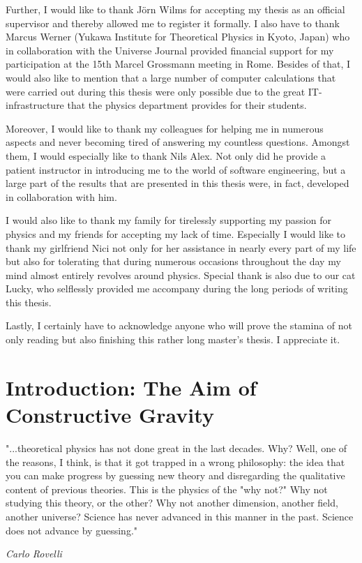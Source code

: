 \documentclass[a4paper,12pt, DIV=14, BCOR=5mm, twoside, headsepline, numbers=noenddot]{scrbook}
\begin{document}
Further, I would like to thank Jörn Wilms for accepting my thesis as an official supervisor
and thereby allowed me to register it formally. 
I also have to thank Marcus Werner (Yukawa Institute for Theoretical Physics in Kyoto, Japan) who in collaboration with the Universe Journal provided financial support for my participation at the 15th Marcel Grossmann meeting in Rome. 
Besides of that, I would also like to mention that a large number of computer calculations that were carried out during this thesis were only possible due to the great IT-infrastructure that the physics department provides for their students. 


Moreover, I would like to thank my colleagues for helping me in numerous aspects and never becoming tired of answering my countless questions.
Amongst them, I would especially like to thank Nils Alex.
Not only did he provide a patient instructor in introducing me to the world of software engineering, 
but a large part of the results that are presented in this thesis were, in fact, developed in collaboration with him. 


I would also like to thank my family for tirelessly supporting my passion for physics and my friends for accepting my lack of time.
Especially I would like to thank my girlfriend Nici not only for her assistance in nearly every part of my life but also
for tolerating that during numerous occasions throughout the day my mind almost entirely revolves around physics. 
Special thank is also due to our cat Lucky, who selflessly provided me accompany during the long periods of writing this thesis. 

Lastly, I certainly have to acknowledge anyone who will prove the stamina of not only reading but also finishing this rather long master's thesis. I appreciate it. 

\mainmatter

\chapter{Introduction: The Aim of Constructive Gravity}
\setlength{\epigraphwidth}{0.6\textwidth}
\epigraph{"...theoretical physics has not done great in the last decades. Why? Well, one of the reasons, I think, is that it got trapped in a wrong philosophy: the idea that you can make progress by guessing new theory and disregarding the qualitative content of previous theories. This is the physics of the "why not?" Why not studying this theory, or the other? Why not another dimension, another field, another universe? Science has never advanced in this manner in the past. Science does not advance by guessing."}{\textit{Carlo Rovelli}}
\end{document}
